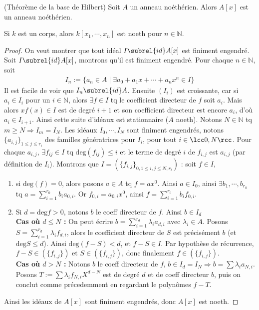         \begin{theo} (Théorème de la base de Hilbert)
            \label{base_de_hilbert}
            Soit $A$ un anneau noéthérien. Alors $A[x]$ est un anneau noéthérien.
        \end{theo}
        \begin{coro}
            Si $k$ est un corps, alors $k[x_1, \cdots, x_n]$ est noeth pour $n \in \mathbb{N}$.
        \end{coro}
        \begin{proof}
            On veut montrer que tout idéal $I \subrel{id} A[x]$ est finiment engendré. Soit $I \subrel{id} A[x]$, montrons qu'il est finiment engendré. Pour chaque $n \in \mathbb{N}$, soit
            \begin{align*}
                I_n := \{a_n \in A \mid \exists a_0 + a_1x + \cdots + a_n x^n \in I\}
            \end{align*}
            Il est facile de voir que $I_n \subrel{id} A$. Ensuite $(I_i)$ est croissante, car si $a_i \in I_i$ pour un $i \in \mathbb{N}$, alors $\exists f \in I$ tq le coefficient directeur de $f$ soit $a_i$. Mais alors $xf(x) \in I$ est de degré $i+1$ et son coefficient directeur est encore $a_i$, d'où $a_i \in I_{i+1}$. Ainsi cette suite d'idéaux est stationnaire ($A$ noeth). Notons $N \in \mathbb{N}$ tq $m \geq N \Rightarrow I_m = I_N$. Les idéaux $I_0, \cdots, I_N$ sont finiment engendrés, notons $\{a_{i,j}\}_{1 \leq j \leq r_i}$ des familles génératrices pour $I_i$, pour tout $i \in \lcc 0, N \rcc$. Pour chaque $a_{i,j}$, $\exists f_{ij} \in I$ tq $\mathrm{deg}(f_{ij}) \leq i$ et le terme de degré $i$ de $f_{i,j}$ est $a_{i,j}$ (par définition de $I_i$). Montrons que $I = (\{f_{i,j}\}_{0,1 \leq i,j \leq N,r_i})$ : soit $f \in I$,
            \begin{enumerate}
                \item si $\mathrm{deg}(f) = 0$, alors posons $a \in A$ tq $f = ax^0$. Ainsi $a \in I_0$, ainsi $\exists b_1, \cdots, b_{r_0}$ tq $a = \sum_{i = 1}^{r_0} b_i a_{0,i}$. Or $f_{0,i} = a_{0,i}x^0$, ainsi $f = \sum_{i = 1}^{r_0} b_i f_{0,i}$.
                \item Si $d = \mathrm{deg} f > 0$, notons $b$ le coeff directeur de $f$. Ainsi $b \in I_d$ \\
                \textbf{Cas où $d \leq N$ :} On peut écrire $b = \sum_{i = 1}^{r_d} \lambda_i a_{d,i}$ avec $\lambda_i \in A$. Posons $S = \sum_{i = 1}^{r_d} \lambda_i f_{d,i}$, alors le coefficient directeur de $S$ est précisément $b$ (et $\mathrm{deg} S \leq d$). Ainsi $\mathrm{deg} (f-S) < d$, et $f - S \in I$. Par hypothèse de récurrence, $f - S \in (\{f_{i,j}\})$ et $S \in (\{f_{i,j}\})$, donc finalement $f \in (\{f_{i,j}\})$. \\
                \textbf{Cas où $d > N$ :} Notons $b$ le coeff directeur de $f$, $b \in I_d = I_N \Rightarrow b = \sum \lambda_i a_{N,i}$. Posons $T := \sum \lambda_i f_{N,i}X^{d-N}$ est de degré $d$ et de coeff directeur $b$, puis on conclut comme précedemment en regardant le polynômes $f - T$.
            \end{enumerate}
            Ainsi les idéaux de $A[x]$ sont finiment engendrés, donc $A[x]$ est noeth.
        \end{proof}

